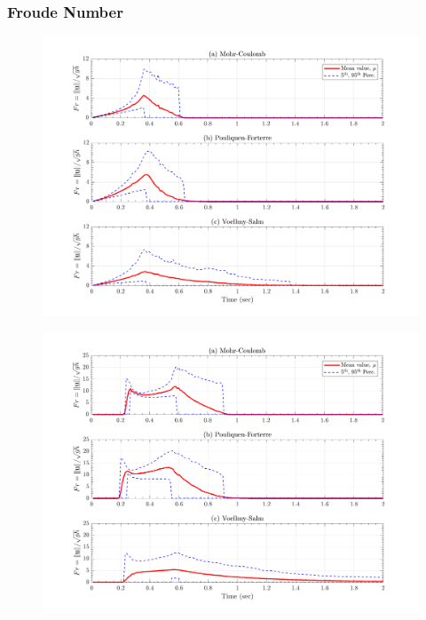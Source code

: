 \documentclass{article}
\begin{document}
\subsubsection{Froude Number}
\begin{figure}[H]
	\begin{minipage}[b]{0.5\linewidth}
    	\centering
    	\includegraphics[width=1\textwidth]{InclinedPlane/Froude/Fr_L1.png}
    	\label{fig:Ramp-L1-Fr}
	\end{minipage}
	\begin{minipage}[b]{0.5\linewidth}
		\centering
		\includegraphics[width=1\textwidth]{InclinedPlane/Froude/Fr_L2.png}
    	\label{fig:Ramp-L2-Fr}
    \end{minipage}


\end{figure}
\end{document}
